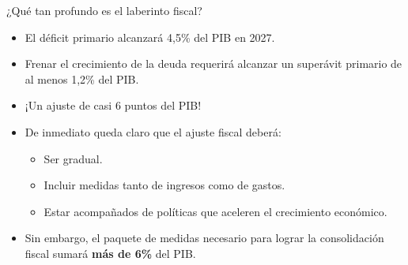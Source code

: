 \begin{frame}{¿Qué tan profundo es el laberinto fiscal?}
    \begin{itemize}
        \item El déficit primario alcanzará 4,5\% del PIB en 2027.
        \item Frenar el crecimiento de la deuda requerirá alcanzar un superávit primario de al menos 1,2\% del PIB.
        \item ¡Un ajuste de casi 6 puntos del PIB!
        \item De inmediato queda claro que el ajuste fiscal deberá:
        \begin{itemize}
            \item Ser gradual.
            \item Incluir medidas tanto de ingresos como de gastos.
            \item Estar acompañados de políticas que aceleren el crecimiento económico.
        \end{itemize}
        \item Sin embargo, el paquete de medidas necesario para lograr la consolidación fiscal sumará \textbf{más de 6\%} del PIB. 
        \end{itemize}
\end{frame}
